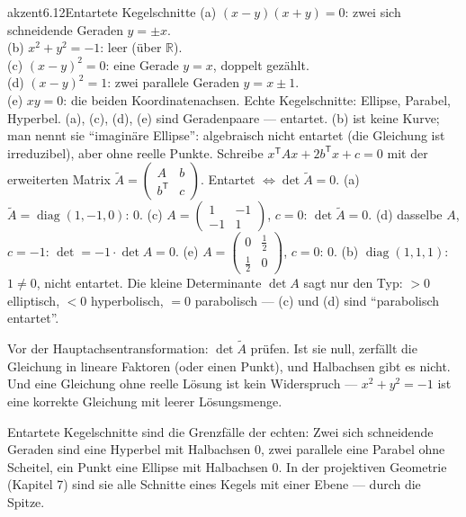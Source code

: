 \begin{loesungkarte}{akzent}{6.12}{Entartete Kegelschnitte}
(a) $(x - y)(x + y) = 0$: zwei sich schneidende Geraden $y = \pm x$. \\
(b) $x^{2} + y^{2} = -1$: leer (über $\mathbb R$). \\
(c) $(x - y)^{2} = 0$: eine Gerade $y = x$, doppelt gezählt. \\
(d) $(x - y)^{2} = 1$: zwei parallele Geraden $y = x\pm1$. \\
(e) $xy = 0$: die beiden Koordinatenachsen.
Echte Kegelschnitte: Ellipse, Parabel, Hyperbel. (a), (c), (d), (e) sind Geradenpaare --- entartet. (b) ist keine Kurve; man nennt sie \enquote{imaginäre Ellipse}: algebraisch nicht entartet (die Gleichung ist irreduzibel), aber ohne reelle Punkte.
Schreibe $x^{\mathsf T}Ax + 2b^{\mathsf T}x + c = 0$ mit der erweiterten Matrix $\tilde A = \begin{pmatrix}A & b\\ b^{\mathsf T} & c\end{pmatrix}$. Entartet $\iff\det\tilde A = 0$. (a) $\tilde A = \operatorname{diag}(1, -1, 0)$: $0$. (c) $A = \begin{pmatrix}1 & -1\\ -1 & 1\end{pmatrix}$, $c = 0$: $\det\tilde A = 0$. (d) dasselbe $A$, $c = -1$: $\det = -1\cdot\det A = 0$. (e) $A = \begin{pmatrix}0 & \frac12\\ \frac12 & 0\end{pmatrix}$, $c = 0$: $0$. (b) $\operatorname{diag}(1, 1, 1)$: $1\neq0$, nicht entartet. Die kleine Determinante $\det A$ sagt nur den Typ: $> 0$ elliptisch, $< 0$ hyperbolisch, $= 0$ parabolisch --- (c) und (d) sind \enquote{parabolisch entartet}.
\begin{fehler}\kastentext
Vor der Hauptachsentransformation: $\det\tilde A$ prüfen. Ist sie null, zerfällt die Gleichung in lineare Faktoren (oder einen Punkt), und Halbachsen gibt es nicht. Und eine Gleichung ohne reelle Lösung ist kein Widerspruch --- $x^{2} + y^{2} = -1$ ist eine korrekte Gleichung mit leerer Lösungsmenge.
\end{fehler}
\begin{mitnehmen}\kastentext
Entartete Kegelschnitte sind die Grenzfälle der echten: Zwei sich schneidende Geraden sind eine Hyperbel mit Halbachsen $0$, zwei parallele eine Parabel ohne Scheitel, ein Punkt eine Ellipse mit Halbachsen $0$. In der projektiven Geometrie (Kapitel 7) sind sie alle Schnitte eines Kegels mit einer Ebene --- durch die Spitze.
\end{mitnehmen}
\end{loesungkarte}

